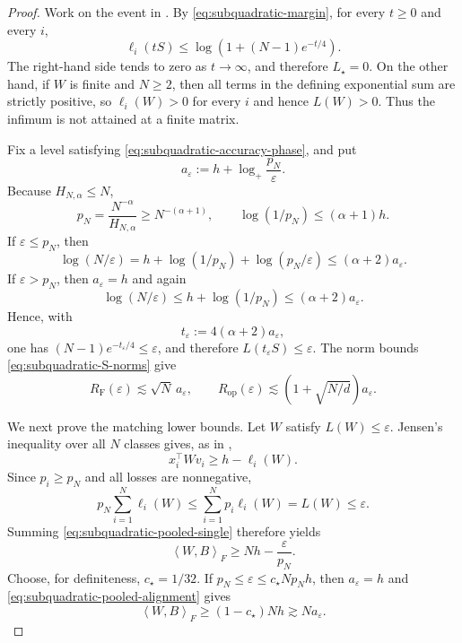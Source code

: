 \documentclass[11pt]{article}
\theoremstyle{definition}
\newcommand{\ip}[2]{\left\langle #1,#2\right\rangle_F}
\newcommand{\RF}{R_{\mathrm F}}
\newcommand{\Rop}{R_{\mathrm{op}}}
\newcommand{\eps}{\varepsilon}
\begin{document}
\begin{proof}
Work on the event in .  By
\eqref{eq:subquadratic-margin}, for every $t\geq0$ and every $i$,
\[
 \ell_i(tS)
 \leq
 \log\left(1+(N-1)e^{-t/4}\right).
\]
The right-hand side tends to zero as $t\to\infty$, and therefore
$L_\star=0$.  On the other hand, if $W$ is finite and $N\geq2$, then
all terms in the defining exponential sum are strictly positive, so
$\ell_i(W)>0$ for every $i$ and hence $L(W)>0$.  Thus the infimum is not
attained at a finite matrix.

Fix a level satisfying \eqref{eq:subquadratic-accuracy-phase}, and put
\begin{equation}
 a_\eps:=h+\log_+\frac{p_N}{\eps}.
 \label{eq:subquadratic-aeps}
\end{equation}
Because $H_{N,\alpha}\leq N$,
\[
 p_N=\frac{N^{-\alpha}}{H_{N,\alpha}}
 \geq N^{-(\alpha+1)},
 \qquad
 \log(1/p_N)\leq(\alpha+1)h.
\]
If $\eps\leq p_N$, then
\[
 \log(N/\eps)
 =h+\log(1/p_N)+\log(p_N/\eps)
 \leq(\alpha+2)a_\eps.
\]
If $\eps>p_N$, then $a_\eps=h$ and again
\[
 \log(N/\eps)
 \leq h+\log(1/p_N)
 \leq(\alpha+2)a_\eps.
\]
Hence, with
\[
 t_\eps:=4(\alpha+2)a_\eps,
\]
one has $(N-1)e^{-t_\eps/4}\leq\eps$, and therefore
$L(t_\eps S)\leq\eps$.  The norm bounds
\eqref{eq:subquadratic-S-norms} give
\begin{equation}
 \RF(\eps)\lesssim\sqrt N\,a_\eps,
 \qquad
 \Rop(\eps)\lesssim
 \left(1+\sqrt{N/d}\right)a_\eps.
 \label{eq:subquadratic-upper-radii}
\end{equation}

We next prove the matching lower bounds.  Let $W$ satisfy
$L(W)\leq\eps$.  Jensen's inequality over all $N$ classes gives, as in
,
\begin{equation}
 x_i^\top Wv_i\geq h-\ell_i(W).
 \label{eq:subquadratic-pooled-single}
\end{equation}
Since $p_i\geq p_N$ and all losses are nonnegative,
\[
 p_N\sum_{i=1}^N\ell_i(W)
 \leq\sum_{i=1}^Np_i\ell_i(W)
 =L(W)\leq\eps.
\]
Summing \eqref{eq:subquadratic-pooled-single} therefore yields
\begin{equation}
 \ip{W}{B}\geq Nh-\frac\eps{p_N}.
 \label{eq:subquadratic-pooled-alignment}
\end{equation}
Choose, for definiteness, $c_\star=1/32$.  If
$p_N\leq\eps\leq c_\star Np_Nh$, then $a_\eps=h$ and
\eqref{eq:subquadratic-pooled-alignment} gives
\begin{equation}
 \ip{W}{B}\geq(1-c_\star)Nh\gtrsim Na_\eps.
 \label{eq:subquadratic-alignment-large}
\end{equation}


\end{proof}
\end{document}
